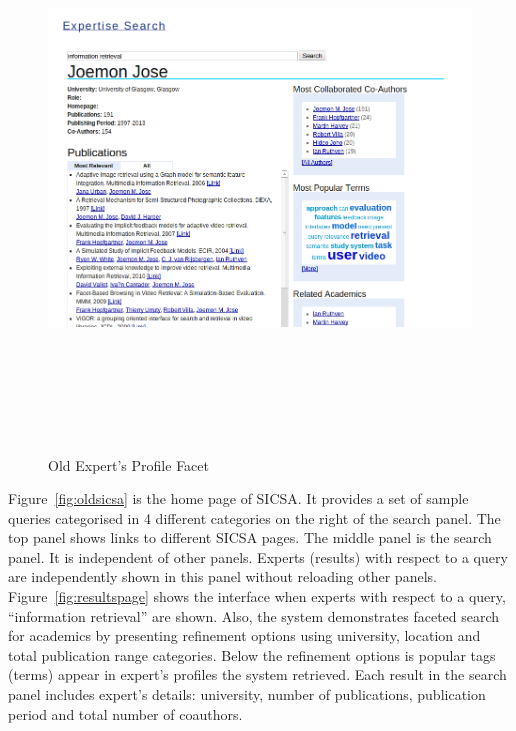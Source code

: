 \begin{figure}
 \centering
 \includegraphics[width=13cm,height=15cm,keepaspectratio]{./figures/oldProfilePage.png}
 \caption{Old Expert's Profile Facet} \label{fig:profilepage} 
\end{figure}
Figure~\ref{fig:oldsicsa} is the home page of SICSA. It provides a set of sample queries categorised in 4 different categories on the right of the 
search panel. The top panel shows links to different SICSA pages. The middle panel is the search panel. It is independent of other panels. 
Experts (results) with respect to a query are independently shown in this panel without reloading other panels. Figure~\ref{fig:resultspage} shows
the interface when experts with respect to a query, ``information retrieval'' are shown. Also, the system demonstrates 
faceted search for academics by presenting refinement options using university, location and total publication range categories.
Below the refinement options is popular tags (terms) appear in expert's profiles the system retrieved.
Each result in the search panel includes expert's details: university, number of publications, publication period and total number of coauthors.

